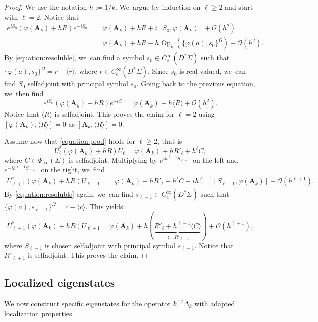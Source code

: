 \documentclass[10pt]{amsart}
\newcommand{\bA}{\boldsymbol{A}}
\theoremstyle{plain}
\theoremstyle{definition}
\let\mc\mathcal
\DeclareMathOperator{\comp}{c}
\DeclareMathOperator{\Op}{Op}
\begin{document}
\begin{proof}
We use the notation $h:=1/k$. We~argue by induction on $\ell \geq 2$ and start with $\ell=2$. Notice that
\[
\begin{split}
e^{iS_0}(\varphi(\bA_k) + hR)e^{-iS_0} & = \varphi(\bA_k) + hR + i[S_0,\varphi(\bA_k)] + \mc{O}(h^{2}) \\
& = \varphi(\bA_k) + hR - h\Op_k(\{\varphi(a),s_0\}^\Omega) + \mc{O}(h^{2}).
\end{split}
\]
By \eqref{equation:resoluble}, we~can find a symbol $s_0 \in C^\infty_{{\comp}}(D^*\Sigma)$ such that $\{\varphi(a),s_0\}^\Omega = r-\langle r\rangle$, where $r \in C^\infty_{{\comp}}(D^*\Sigma)$. Since $s_0$ is real-valued, we~can find $S_0$ selfadjoint with principal symbol $s_0$. Going back to the previous equation, we~then find
\[
e^{iS_0}(\varphi(\bA_k) + hR)e^{-iS_0} = \varphi(\bA_k) + h\langle R\rangle + \mc{O}(h^{2}).
\]
Notice that $\langle R \rangle$ is selfadjoint. This proves the claim for $\ell=2$ using $[\varphi(\bA_k),\langle R\rangle]=0$ as $[\bA_k,\langle R\rangle]=0$.

Assume now that \eqref{equation:prod} holds for $\ell \geq 2$, that is
\[
U_{\ell}^* (\varphi(\bA_k) + hR) U_{\ell} = \varphi(\bA_k) + hR'_\ell + h^{\ell} C,
\]
where $C \in \Psi_{\mathrm{tsc}}(\Sigma)$ is selfadjoint. Multiplying by $e^{i h^{\ell-1}S_{\ell-1}}$ on the left and $e^{-i h^{\ell-1}S_{\ell-1}}$ on the right, we~find
\[
\begin{split}
U_{\ell +1}^* (\varphi(\bA_k) + hR) U_{\ell+1} & = \varphi(\bA_k) + hR'_\ell + h^{\ell} C + i h^{\ell-1}[S_{\ell-1}, \varphi(\bA_k)] + \mc{O}(h^{\ell+1}).
\end{split}
\]
By \eqref{equation:resoluble} again, we~can find $s_{\ell-1} \in C^\infty_{{\comp}}(D^*\Sigma)$ such that $\{\varphi(a),s_{\ell-1}\}^\Omega = c-\langle c\rangle$. This yields:
\[
U_{\ell +1}^* (\varphi(\bA_k) + hR) U_{\ell+1} = \varphi(\bA_k) + h(\underbrace{R'_\ell + h^{\ell-1} \langle C\rangle}_{:=R'_{\ell+1}}) + \mc{O}(h^{\ell+1}),
\]
where $S_{\ell-1}$ is chosen selfadjoint with principal symbol $s_{\ell-1}$. Notice that $R'_{\ell +1}$ is selfadjoint. This proves the claim.
\end{proof}

\subsection{Localized eigenstates} \label{ssection:quasimodes} We now construct specific eigenstates for the operator $k^{-2}\Delta_k$ with adapted localization properties.
\end{document}
